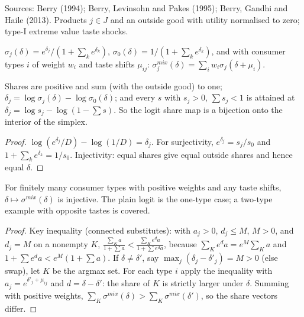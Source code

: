 Sources: Berry (1994); Berry, Levinsohn and Pakes (1995); Berry, Gandhi and Haile (2013). Products $j\in J$ and an
outside good with utility normalised to zero; type-I extreme value taste shocks.

\begin{definition}
\label{def:logit-shares}
\leanok
$\sigma_j(\delta) = e^{\delta_j}/(1+\sum_ke^{\delta_k})$, $\sigma_0(\delta) = 1/(1+\sum_ke^{\delta_k})$, and with
consumer types $i$ of weight $w_i$ and taste shifts $\mu_{ij}$:
$\sigma^{mix}_j(\delta) = \sum_iw_i\sigma_j(\delta+\mu_i)$.
\end{definition}

\begin{theorem}
\label{thm:berry}
\leanok
{}
Shares are positive and sum (with the outside good) to one; $\delta_j = \log\sigma_j(\delta) - \log\sigma_0(\delta)$;
and every $s$ with $s_j>0$, $\sum s_j<1$ is attained at $\delta_j = \log s_j - \log(1-\sum s)$. So the logit share map
is a bijection onto the interior of the simplex.
\end{theorem}
\begin{proof}
\leanok
$\log(e^{\delta_j}/D) - \log(1/D) = \delta_j$. For surjectivity, $e^{\delta_j} = s_j/s_0$ and
$1+\sum_ke^{\delta_k} = 1/s_0$. Injectivity: equal shares give equal outside shares and hence equal $\delta$.
\end{proof}

\begin{theorem}
\label{thm:blp-injective}
\leanok
{}
For finitely many consumer types with positive weights and any taste shifts, $\delta\mapsto\sigma^{mix}(\delta)$ is
injective. The plain logit is the one-type case; a two-type example with opposite tastes is covered.
\end{theorem}
\begin{proof}
\leanok
Key inequality (connected substitutes): with $a_j>0$, $d_j\le M$, $M>0$, and $d_j = M$ on a nonempty $K$,
$\frac{\sum_Ka}{1+\sum a} < \frac{\sum_Ke^{d}a}{1+\sum e^{d}a}$, because $\sum_Ke^da = e^M\sum_Ka$ and
$1+\sum e^da < e^M(1+\sum a)$. If $\delta\ne\delta'$, say $\max_j(\delta_j-\delta'_j) = M>0$ (else swap), let $K$ be
the argmax set. For each type $i$ apply the inequality with $a_j = e^{\delta'_j+\mu_{ij}}$ and
$d = \delta-\delta'$: the share of $K$ is strictly larger under $\delta$. Summing with positive weights,
$\sum_K\sigma^{mix}(\delta)>\sum_K\sigma^{mix}(\delta')$, so the share vectors differ.
\end{proof}
